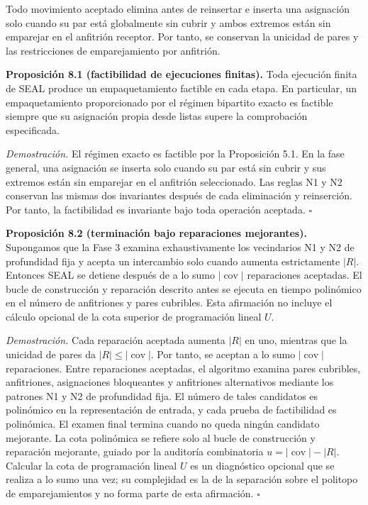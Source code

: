 \documentclass[spanish,11pt,a4paper]{article}
\begin{document}
Todo movimiento aceptado elimina antes de reinsertar e inserta una
asignación solo cuando su par está globalmente sin cubrir y ambos
extremos están sin emparejar en el anfitrión receptor. Por tanto, se
conservan la unicidad de pares y las restricciones de emparejamiento por
anfitrión.

\textbf{Proposición 8.1 (factibilidad de ejecuciones finitas).} Toda
ejecución finita de SEAL produce un empaquetamiento factible en cada
etapa. En particular, un empaquetamiento proporcionado por el régimen
bipartito exacto es factible siempre que su asignación propia desde
listas supere la comprobación especificada.

\emph{Demostración.} El régimen exacto es factible por la Proposición
5.1. En la fase general, una asignación se inserta solo cuando su par
está sin cubrir y sus extremos están sin emparejar en el anfitrión
seleccionado. Las reglas N1 y N2 conservan las mismas dos invariantes
después de cada eliminación y reinserción. Por tanto, la factibilidad es
invariante bajo toda operación aceptada. \(\square\)

\textbf{Proposición 8.2 (terminación bajo reparaciones mejorantes).}
Supongamos que la Fase 3 examina exhaustivamente los vecindarios N1 y N2
de profundidad fija y acepta un intercambio solo cuando aumenta
estrictamente \(|R|\). Entonces SEAL se detiene después de a lo sumo
\(\lvert\operatorname{cov}\rvert\) reparaciones aceptadas. El bucle de
construcción y reparación descrito antes se ejecuta en tiempo polinómico
en el número de anfitriones y pares cubribles. Esta afirmación no
incluye el cálculo opcional de la cota superior de programación lineal
\(U\).

\emph{Demostración.} Cada reparación aceptada aumenta \(|R|\) en uno,
mientras que la unicidad de pares da \(|R|\le |\operatorname{cov}|\).
Por tanto, se aceptan a lo sumo \(|\operatorname{cov}|\) reparaciones.
Entre reparaciones aceptadas, el algoritmo examina pares cubribles,
anfitriones, asignaciones bloqueantes y anfitriones alternativos
mediante los patrones N1 y N2 de profundidad fija. El número de tales
candidatos es polinómico en la representación de entrada, y cada prueba
de factibilidad es polinómica. El examen final termina cuando no queda
ningún candidato mejorante. La cota polinómica se refiere solo al bucle
de construcción y reparación mejorante, guiado por la auditoría
combinatoria \(u=\lvert\operatorname{cov}\rvert-\lvert R\rvert\).
Calcular la cota de programación lineal \(U\) es un diagnóstico opcional
que se realiza a lo sumo una vez; su complejidad es la de la separación
sobre el politopo de emparejamientos y no forma parte de esta
afirmación. \(\square\)
\end{document}
